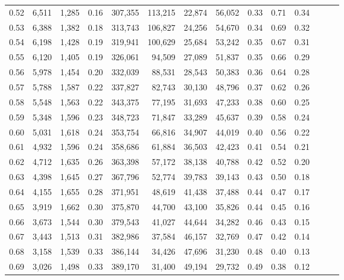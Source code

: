 \begin{tabular}{rrrrrrrrrrrrrr}
0.52 &   6,511 &  1,285 &  0.16 &  307,355 &  113,215 &  22,874 &  56,052 &  0.33 &  0.71 &      0.34 \\
0.53 &   6,388 &  1,382 &  0.18 &  313,743 &  106,827 &  24,256 &  54,670 &  0.34 &  0.69 &      0.32 \\
0.54 &   6,198 &  1,428 &  0.19 &  319,941 &  100,629 &  25,684 &  53,242 &  0.35 &  0.67 &      0.31 \\
0.55 &   6,120 &  1,405 &  0.19 &  326,061 &   94,509 &  27,089 &  51,837 &  0.35 &  0.66 &      0.29 \\
0.56 &   5,978 &  1,454 &  0.20 &  332,039 &   88,531 &  28,543 &  50,383 &  0.36 &  0.64 &      0.28 \\
0.57 &   5,788 &  1,587 &  0.22 &  337,827 &   82,743 &  30,130 &  48,796 &  0.37 &  0.62 &      0.26 \\
0.58 &   5,548 &  1,563 &  0.22 &  343,375 &   77,195 &  31,693 &  47,233 &  0.38 &  0.60 &      0.25 \\
0.59 &   5,348 &  1,596 &  0.23 &  348,723 &   71,847 &  33,289 &  45,637 &  0.39 &  0.58 &      0.24 \\
0.60 &   5,031 &  1,618 &  0.24 &  353,754 &   66,816 &  34,907 &  44,019 &  0.40 &  0.56 &      0.22 \\
0.61 &   4,932 &  1,596 &  0.24 &  358,686 &   61,884 &  36,503 &  42,423 &  0.41 &  0.54 &      0.21 \\
0.62 &   4,712 &  1,635 &  0.26 &  363,398 &   57,172 &  38,138 &  40,788 &  0.42 &  0.52 &      0.20 \\
0.63 &   4,398 &  1,645 &  0.27 &  367,796 &   52,774 &  39,783 &  39,143 &  0.43 &  0.50 &      0.18 \\
0.64 &   4,155 &  1,655 &  0.28 &  371,951 &   48,619 &  41,438 &  37,488 &  0.44 &  0.47 &      0.17 \\
0.65 &   3,919 &  1,662 &  0.30 &  375,870 &   44,700 &  43,100 &  35,826 &  0.44 &  0.45 &      0.16 \\
0.66 &   3,673 &  1,544 &  0.30 &  379,543 &   41,027 &  44,644 &  34,282 &  0.46 &  0.43 &      0.15 \\
0.67 &   3,443 &  1,513 &  0.31 &  382,986 &   37,584 &  46,157 &  32,769 &  0.47 &  0.42 &      0.14 \\
0.68 &   3,158 &  1,539 &  0.33 &  386,144 &   34,426 &  47,696 &  31,230 &  0.48 &  0.40 &      0.13 \\
0.69 &   3,026 &  1,498 &  0.33 &  389,170 &   31,400 &  49,194 &  29,732 &  0.49 &  0.38 &      0.12 \\

\end{tabular}
